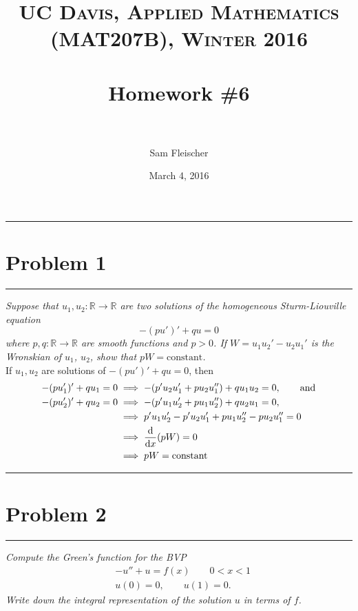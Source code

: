 \documentclass{article} %
\title{ 
\normalfont \normalsize 
\textsc{UC Davis, Applied Mathematics (MAT207B), Winter 2016} \\ [25pt] %
\horrule{2pt} \\[0.4cm] %
\Huge Homework \#6 \\ %
\horrule{2pt} \\[0.5cm] %
}
\author{\huge Sam Fleischer} %
\date{March 4, 2016} %
\theoremstyle{plain}
\def\Rl{\mathbb{R}}
\newcommand{\problem}[1]{
\vspace{.375cm}
\begin{minipage}{\textwidth}
    \begin{center}
        \noindent\rule{5cm}{1pt}
    \end{center}
    \section{\bf #1}
    \begin{center}
        \noindent\rule{5cm}{1pt}
    \end{center}
    \vspace{0.25cm}
\end{minipage}
}
\begin{document}
\thispagestyle{empty}

\maketitle %

\makeatletter
{}
\makeatother

\pagebreak

\problem{Problem 1}
\emph{Suppose that $u_1, u_2 : \Rl \to \Rl$ are two solutions of the homogeneous Sturm-Liouville equation
\[
-(pu')' + q u = 0
\]
where $p, q: \Rl \to \Rl$ are smooth functions and $p>0$.
If $W = u_1 u_2' - u_2 u_1'$
is the Wronskian of $u_1$, $u_2$, show that
$p W = \text{constant}$.} \\

If $u_1, u_2$ are solutions of $-(pu')' + qu = 0$, then
\begin{align*}
    -(pu_1')' + qu_1 = 0 &\implies -\qty(p'u_2u_1' + pu_2u_1'') + qu_1u_2 = 0, \qquad \text{and}\\
    -(pu_2')' + qu_2 = 0 &\implies -\qty(p'u_1u_2' + pu_1u_2'') + qu_2u_1 = 0, \\
    &\implies p'u_1u_2' - p'u_2u_1' + pu_1u_2'' - pu_2u_1'' = 0 \\
    &\implies \frac{\dd}{\dd x}\qty(pW) = 0 \\
    &\implies pW = \text{constant}
\end{align*}






\problem{Problem 2}
\emph{Compute the Green's function for the BVP
\begin{align*}
&-u'' + u = f(x)\qquad 0<x<1
\\
&u(0)=0,\qquad u(1)=0.
\end{align*}
Write down the integral representation of the solution $u$ in terms of $f$.} \\
\end{document}
